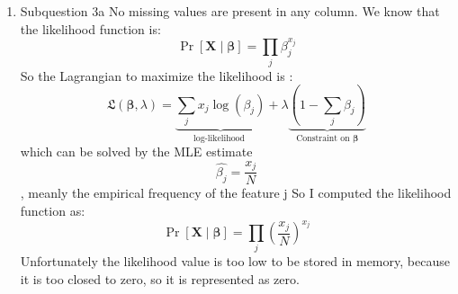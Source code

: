 \documentclass[12pt,twoside]{article}
\begin{document}
\begin{enumerate}
\begin{enumerate}
	\item Subquestion 3a 
	No missing values are present in any column.
	We know that the likelihood function is:
	\begin{equation}
		\operatorname{Pr}[\mathbf{X} \mid \boldsymbol{\beta}]=\prod_j \beta_j^{x_j}
	\end{equation}
	So the Lagrangian to maximize the likelihood is :
	\begin{equation}
		\mathfrak{L}(\boldsymbol{\beta}, \lambda)=\underbrace{\sum_j x_j \log \left(\beta_j\right)}_{\text {log-likelihood }}+\lambda \underbrace{\left(1-\sum_j \beta_j\right)}_{\text {Constraint on } \boldsymbol{\beta}}
	\end{equation}
	which can be solved by the MLE estimate $$\hat{\beta_j}= \frac{x_j}{N}$$, meanly the empirical frequency of the feature j
	So I computed the likelihood function as:
	\begin{equation}
		\operatorname{Pr}[\mathbf{X} \mid \boldsymbol{\beta}]=\prod_j \left(\frac{x_j}{N}\right)^{x_j}
	\end{equation}
	Unfortunately the likelihood value is too low to be stored in memory, because it is too closed to zero, so it is represented as zero.
	

\end{enumerate}
\end{enumerate}
\end{document}
